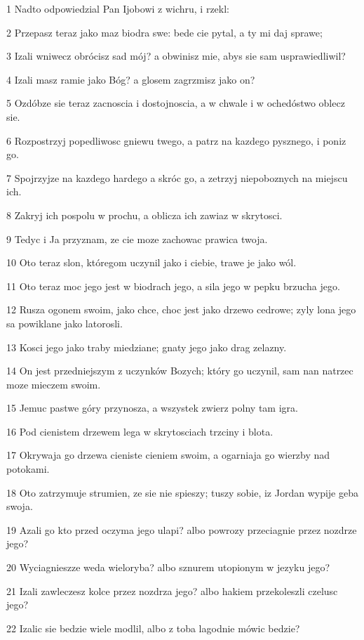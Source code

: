 \par 1 Nadto odpowiedzial Pan Ijobowi z wichru, i rzekl:
\par 2 Przepasz teraz jako maz biodra swe: bede cie pytal, a ty mi daj sprawe;
\par 3 Izali wniwecz obrócisz sad mój? a obwinisz mie, abys sie sam usprawiedliwil?
\par 4 Izali masz ramie jako Bóg? a glosem zagrzmisz jako on?
\par 5 Ozdóbze sie teraz zacnoscia i dostojnoscia, a w chwale i w ochedóstwo oblecz sie.
\par 6 Rozpostrzyj popedliwosc gniewu twego, a patrz na kazdego pysznego, i poniz go.
\par 7 Spojrzyjze na kazdego hardego a skróc go, a zetrzyj niepoboznych na miejscu ich.
\par 8 Zakryj ich pospolu w prochu, a oblicza ich zawiaz w skrytosci.
\par 9 Tedyc i Ja przyznam, ze cie moze zachowac prawica twoja.
\par 10 Oto teraz slon, któregom uczynil jako i ciebie, trawe je jako wól.
\par 11 Oto teraz moc jego jest w biodrach jego, a sila jego w pepku brzucha jego.
\par 12 Rusza ogonem swoim, jako chce, choc jest jako drzewo cedrowe; zyly lona jego sa powiklane jako latorosli.
\par 13 Kosci jego jako traby miedziane; gnaty jego jako drag zelazny.
\par 14 On jest przedniejszym z uczynków Bozych; który go uczynil, sam nan natrzec moze mieczem swoim.
\par 15 Jemuc pastwe góry przynosza, a wszystek zwierz polny tam igra.
\par 16 Pod cienistem drzewem lega w skrytosciach trzciny i blota.
\par 17 Okrywaja go drzewa cieniste cieniem swoim, a ogarniaja go wierzby nad potokami.
\par 18 Oto zatrzymuje strumien, ze sie nie spieszy; tuszy sobie, iz Jordan wypije geba swoja.
\par 19 Azali go kto przed oczyma jego ulapi? albo powrozy przeciagnie przez nozdrze jego?
\par 20 Wyciagnieszze weda wieloryba? albo sznurem utopionym w jezyku jego?
\par 21 Izali zawleczesz kolce przez nozdrza jego? albo hakiem przekoleszli czelusc jego?
\par 22 Izalic sie bedzie wiele modlil, albo z toba lagodnie mówic bedzie?
